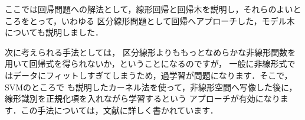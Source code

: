 
ここでは回帰問題への解法として，線形回帰と回帰木を説明し，それらのよいところをとって，いわゆる
区分線形問題として回帰へアプローチした，モデル木についても説明しました．


次に考えられる手法としては，
区分線形よりももっとなめらかな非線形関数を用いて回帰式を得られないか，ということになるのですが，
一般に非線形式ではデータにフィットしすぎてしまうため，過学習が問題になります．そこで，SVMのところで
も説明したカーネル法を使って，非線形空間へ写像した後に，線形識別を正規化項を入れながら学習するという
アプローチが有効になります．この手法については，文献\cite{akaho08}に詳しく書かれています．

